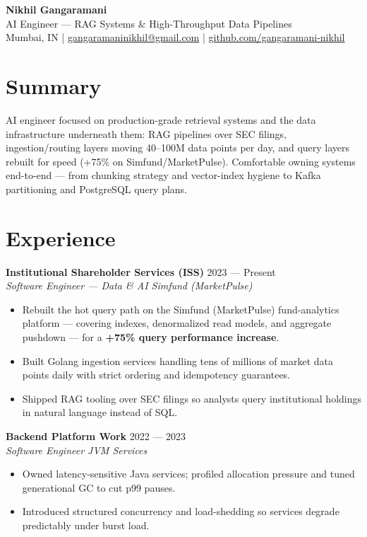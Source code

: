 \documentclass[10pt,a4paper]{article}
\begin{document}
\begin{center}
  {\LARGE\bfseries Nikhil Gangaramani}\\[2pt]
  AI Engineer --- RAG Systems \& High-Throughput Data Pipelines\\[2pt]
  Mumbai, IN \; | \;
  \href{mailto:gangaramaninikhil@gmail.com}{gangaramaninikhil@gmail.com} \; | \;
  \href{https://github.com/gangaramani-nikhil}{github.com/gangaramani-nikhil}
\end{center}

\section{Summary}
AI engineer focused on production-grade retrieval systems and the data
infrastructure underneath them: RAG pipelines over SEC filings,
ingestion/routing layers moving 40--100M data points per day, and query
layers rebuilt for speed (+75\% on Simfund/MarketPulse). Comfortable owning
systems end-to-end --- from chunking strategy and vector-index hygiene to
Kafka partitioning and PostgreSQL query plans.

\section{Experience}
\textbf{Institutional Shareholder Services (ISS)} \hfill 2023 --- Present\\
\textit{Software Engineer --- Data \& AI \hfill Simfund (MarketPulse)}
\begin{itemize}
  \item Rebuilt the hot query path on the Simfund (MarketPulse)
        fund-analytics platform --- covering indexes, denormalized read
        models, and aggregate pushdown --- for a \textbf{+75\% query
        performance increase}.
  \item Built Golang ingestion services handling tens of millions of market
        data points daily with strict ordering and idempotency guarantees.
  \item Shipped RAG tooling over SEC filings so analysts query institutional
        holdings in natural language instead of SQL.
\end{itemize}

\textbf{Backend Platform Work} \hfill 2022 --- 2023\\
\textit{Software Engineer \hfill JVM Services}
\begin{itemize}
  \item Owned latency-sensitive Java services; profiled allocation pressure
        and tuned generational GC to cut p99 pauses.
  \item Introduced structured concurrency and load-shedding so services
        degrade predictably under burst load.
\end{itemize}
\end{document}
